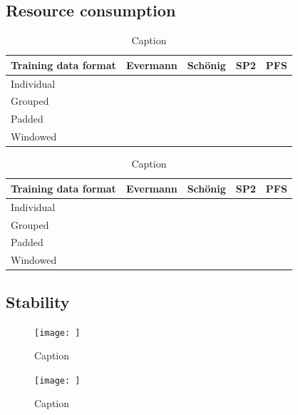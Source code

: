 \subsection*{Resource consumption}
\begin{table}
    \centering
    \begin{tabular}{l|cccc}
        Training data format & Evermann & Schönig & SP2 & PFS\\
        \hline
        Individual &&&\\
        Grouped &&&\\
        Padded &&&\\
        Windowed &&&\\
    \end{tabular}
    \caption{Caption}
    \label{tab:resources_bpic2011}
\end{table}

\begin{table}
    \centering
    \begin{tabular}{l|cccc}
        Training data format & Evermann & Schönig & SP2 & PFS\\
        \hline
        Individual &&&\\
        Grouped &&&\\
        Padded &&&\\
        Windowed &&&\\
    \end{tabular}
    \caption{Caption}
    \label{tab:resources_bpic2017}
\end{table}

\subsection*{Stability}
\begin{figure}
    \centering
    \texttt{[image: ]}
    \caption{Caption}
    \label{fig:earliness_bpic2011}
\end{figure}

\begin{figure}
    \centering
    \texttt{[image: ]}
    \caption{Caption}
    \label{fig:earliness_bpic2017}
\end{figure}